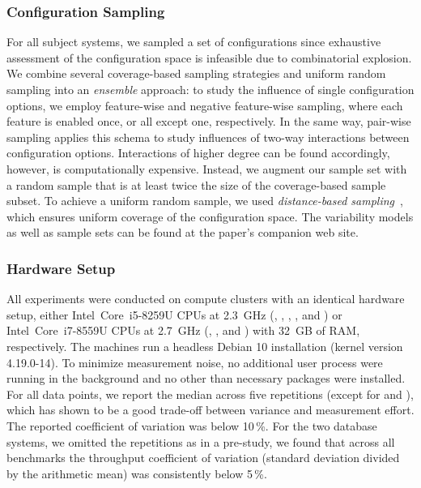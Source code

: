 \subsubsection*{Configuration Sampling}
For all subject systems, we sampled a set of configurations since exhaustive assessment of the configuration space is infeasible due to combinatorial explosion. We combine several coverage-based sampling strategies and uniform random sampling into an \emph{ensemble} approach: to study the influence of single configuration options, we employ feature-wise and negative feature-wise sampling, where each feature is enabled once, or all except one, respectively. In the same way, pair-wise sampling applies this schema to study influences of two-way interactions between configuration options. Interactions of higher degree can be found accordingly, however, is computationally expensive. Instead, we augment our sample set with a random sample that is at least twice the size of the coverage-based sample subset. To achieve a uniform random sample, we used \emph{distance-based sampling}~\cite{kaltenecker_distance-based_2019}, which ensures uniform coverage of the configuration space. The variability models as well as sample sets can be found at the paper's companion web site.


\subsubsection*{Hardware Setup}
All experiments were conducted on compute clusters with an identical hardware setup, either Intel~Core~i5-8259U CPUs at 2.3~GHz (, , , , and ) or Intel~Core~i7-8559U CPUs at 2.7~GHz (, , and ) with 32~GB of RAM, respectively. The machines run a headless Debian 10 installation (kernel version \mbox{4.19.0-14}). To minimize measurement noise, no additional user process were running in the background and no other than necessary packages were installed.
For all data points, we report the median across five repetitions (except for  and ), which has shown to be a good trade-off between variance and measurement effort. The reported coefficient of variation was below {\color{Red}10\,\%}. For the two database systems, we omitted the repetitions as in a pre-study, we found that across all benchmarks the throughput coefficient of variation (standard deviation divided by the arithmetic mean) was consistently below 5\,\%.

